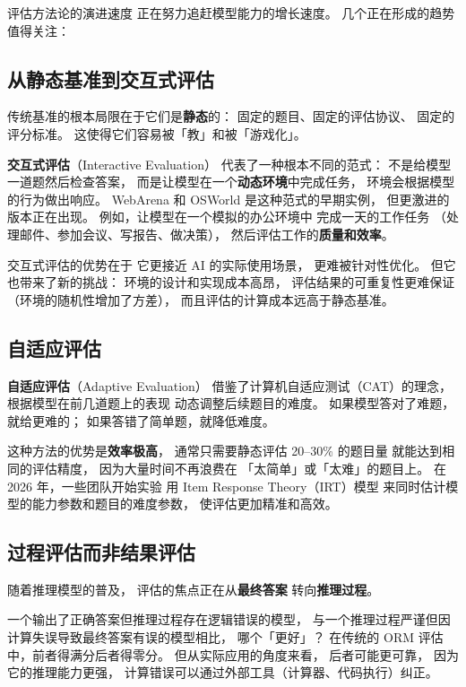 评估方法论的演进速度
正在努力追赶模型能力的增长速度。
几个正在形成的趋势值得关注：

\subsection{从静态基准到交互式评估}

传统基准的根本局限在于它们是\textbf{静态}的：
固定的题目、固定的评估协议、
固定的评分标准。
这使得它们容易被「教」和被「游戏化」。

\textbf{交互式评估}（Interactive Evaluation）
代表了一种根本不同的范式：
不是给模型一道题然后检查答案，
而是让模型在一个\textbf{动态环境}中完成任务，
环境会根据模型的行为做出响应。
WebArena 和 OSWorld 是这种范式的早期实例，
但更激进的版本正在出现。
例如，让模型在一个模拟的办公环境中
完成一天的工作任务
（处理邮件、参加会议、写报告、做决策），
然后评估工作的\textbf{质量和效率}。

交互式评估的优势在于
它更接近 AI 的实际使用场景，
更难被针对性优化。
但它也带来了新的挑战：
环境的设计和实现成本高昂，
评估结果的可重复性更难保证
（环境的随机性增加了方差），
而且评估的计算成本远高于静态基准。

\subsection{自适应评估}

\textbf{自适应评估}（Adaptive Evaluation）
借鉴了计算机自适应测试（CAT）的理念，
根据模型在前几道题上的表现
动态调整后续题目的难度。
如果模型答对了难题，就给更难的；
如果答错了简单题，就降低难度。

这种方法的优势是\textbf{效率极高}，
通常只需要静态评估 20--30\% 的题目量
就能达到相同的评估精度，
因为大量时间不再浪费在
「太简单」或「太难」的题目上。
在 2026 年，一些团队开始实验
用 Item Response Theory（IRT）模型
来同时估计模型的能力参数和题目的难度参数，
使评估更加精准和高效。

\subsection{过程评估而非结果评估}

随着推理模型的普及，
评估的焦点正在从\textbf{最终答案}
转向\textbf{推理过程}。

一个输出了正确答案但推理过程存在逻辑错误的模型，
与一个推理过程严谨但因计算失误导致最终答案有误的模型相比，
哪个「更好」？
在传统的 ORM 评估中，前者得满分后者得零分。
但从实际应用的角度来看，
后者可能更可靠，
因为它的推理能力更强，
计算错误可以通过外部工具（计算器、代码执行）纠正。

